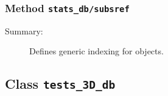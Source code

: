\subsubsection[Method \texttt{subsref}]{Method \texttt{stats\_db/subsref}}%
%
\label{ref_stats_db__subsref}%
\hypertarget{ref_stats_db__subsref}{}%
\begin{description}
\item[Summary:]Defines generic indexing for objects.
%
%
%
%
%
%
%
%
\end{description}
\methodline%
\subsection{Class \texttt{tests\_3D\_db}}%
%
\label{ref_tests_3D_db}%
\hypertarget{ref_tests_3D_db}{}%

